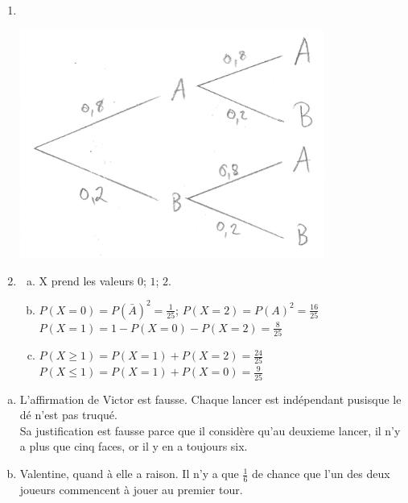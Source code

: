 \documentclass[12pt, a4paper]{article}
\begin{document}
    \begin{Exercise}[number={66}]
      \begin{enumerate}[1.]
        \item \ \\\parbox{\linewidth}{
                    \centering
                    \includegraphics[width=10cm]{VAfig1.jpg}
                  } \bigbreak
        \item \begin{enumerate}[a)]
                \item X prend les valeurs $0$; $1$; $2$.
                \item $P(X=0)=P(\bar{A})^2=\frac{1}{25}$; \quad $P(X=2)=P(A)^2=\frac{16}{25}$ \smallbreak $P(X=1)=1-P(X=0)-P(X=2)=\frac{8}{25}$
                \item $P(X\geq1)=P(X=1)+P(X=2)=\frac{24}{25}$ \smallbreak $P(X\leq1)=P(X=1)+P(X=0)=\frac{9}{25}$
              \end{enumerate}
      \end{enumerate}
    \end{Exercise}

    \pagebreak

    \begin{Exercise}[number={67}]
      \begin{enumerate}[a)]
        \item L'affirmation de Victor est fausse. Chaque lancer est indépendant pusisque le dé n'est pas truqué. \\ Sa justification est fausse parce que il considère qu'au deuxieme lancer, il n'y a plus que cinq faces, or il y en a toujours six.
        \item Valentine, quand à elle a raison. Il n'y a que $\frac{1}{6}$ de chance que l'un des deux joueurs commencent à jouer au premier tour.
      \end{enumerate}
    \end{Exercise}
\end{document}
